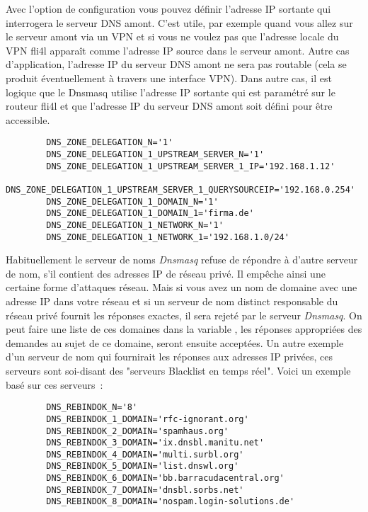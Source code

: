 \begin{description}
        Avec l'option de configuration
         vous
        pouvez définir l'adresse IP sortante qui interrogera le serveur DNS amont.
        C'est utile, par exemple quand vous allez sur le serveur amont via un VPN
        et si vous ne voulez pas que l'adresse locale du VPN fli4l apparaît comme
        l'adresse IP source dans le serveur amont. Autre cas d'application,
        l'adresse IP du serveur DNS amont ne sera pas routable (cela se produit
        éventuellement à travers une interface VPN). Dans autre cas, il est
        logique que le Dnsmasq utilise l'adresse IP sortante qui est paramétré
        sur le routeur fli4l et que l'adresse IP du serveur DNS amont soit défini
        pour être accessible.

\begin{example}
\begin{verbatim}
        DNS_ZONE_DELEGATION_N='1'
        DNS_ZONE_DELEGATION_1_UPSTREAM_SERVER_N='1'
        DNS_ZONE_DELEGATION_1_UPSTREAM_SERVER_1_IP='192.168.1.12'
        DNS_ZONE_DELEGATION_1_UPSTREAM_SERVER_1_QUERYSOURCEIP='192.168.0.254'
        DNS_ZONE_DELEGATION_1_DOMAIN_N='1'
        DNS_ZONE_DELEGATION_1_DOMAIN_1='firma.de'
        DNS_ZONE_DELEGATION_1_NETWORK_N='1'
        DNS_ZONE_DELEGATION_1_NETWORK_1='192.168.1.0/24'
\end{verbatim}
\end{example}


      Habituellement le serveur de noms \emph{Dnsmasq} refuse de répondre à d'autre
      serveur de nom, s'il contient des adresses IP de réseau privé. Il empêche
      ainsi une certaine forme d'attaques réseau. Mais si vous avez un nom de
      domaine avec une adresse IP dans votre réseau et si un serveur de nom
      distinct responsable du réseau privé fournit les réponses exactes,
      il sera rejeté par le serveur \emph{Dnsmasq}. On peut faire une liste
      de ces domaines dans la variable , les réponses
      appropriées des demandes au sujet de ce domaine, seront ensuite acceptées.
      Un autre exemple d'un serveur de nom qui fournirait les réponses aux
      adresses IP privées, ces serveurs sont soi-disant des "serveurs Blacklist
      en temps réel". Voici un exemple basé sur ces serveurs~:

\begin{example}
\begin{verbatim}
        DNS_REBINDOK_N='8'
        DNS_REBINDOK_1_DOMAIN='rfc-ignorant.org'
        DNS_REBINDOK_2_DOMAIN='spamhaus.org'
        DNS_REBINDOK_3_DOMAIN='ix.dnsbl.manitu.net'
        DNS_REBINDOK_4_DOMAIN='multi.surbl.org'
        DNS_REBINDOK_5_DOMAIN='list.dnswl.org'
        DNS_REBINDOK_6_DOMAIN='bb.barracudacentral.org'
        DNS_REBINDOK_7_DOMAIN='dnsbl.sorbs.net'
        DNS_REBINDOK_8_DOMAIN='nospam.login-solutions.de'
\end{verbatim}
\end{example}
\end{description}


